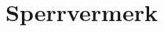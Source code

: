 
\ihead{}
\chead{}
\ohead{\pagemark}

\ifoot{}
\cfoot{}
\ofoot{}

\chapter*{Sperrvermerk}

\thispagestyle{headings}



